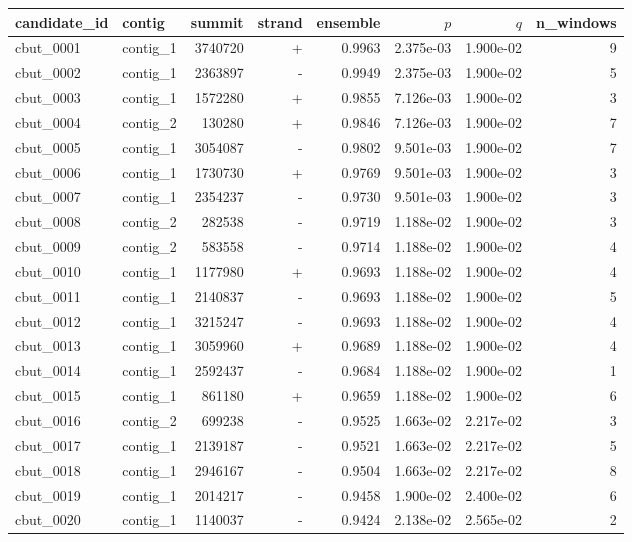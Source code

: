 \documentclass{article}
\begin{document}
{\def\LTcaptype{none} %
\begin{center}
\begin{tabular}{llrrrrrr}
\toprule
candidate\_id & contig & summit & strand & ensemble & $p$ & $q$ & n\_windows \\
\midrule
cbut\_0001 & contig\_1 & 3740720 & + & 0.9963 & 2.375e-03 & 1.900e-02 & 9 \\
cbut\_0002 & contig\_1 & 2363897 & - & 0.9949 & 2.375e-03 & 1.900e-02 & 5 \\
cbut\_0003 & contig\_1 & 1572280 & + & 0.9855 & 7.126e-03 & 1.900e-02 & 3 \\
cbut\_0004 & contig\_2 & 130280 & + & 0.9846 & 7.126e-03 & 1.900e-02 & 7 \\
cbut\_0005 & contig\_1 & 3054087 & - & 0.9802 & 9.501e-03 & 1.900e-02 & 7 \\
cbut\_0006 & contig\_1 & 1730730 & + & 0.9769 & 9.501e-03 & 1.900e-02 & 3 \\
cbut\_0007 & contig\_1 & 2354237 & - & 0.9730 & 9.501e-03 & 1.900e-02 & 3 \\
cbut\_0008 & contig\_2 & 282538 & - & 0.9719 & 1.188e-02 & 1.900e-02 & 3 \\
cbut\_0009 & contig\_2 & 583558 & - & 0.9714 & 1.188e-02 & 1.900e-02 & 4 \\
cbut\_0010 & contig\_1 & 1177980 & + & 0.9693 & 1.188e-02 & 1.900e-02 & 4 \\
cbut\_0011 & contig\_1 & 2140837 & - & 0.9693 & 1.188e-02 & 1.900e-02 & 5 \\
cbut\_0012 & contig\_1 & 3215247 & - & 0.9693 & 1.188e-02 & 1.900e-02 & 4 \\
cbut\_0013 & contig\_1 & 3059960 & + & 0.9689 & 1.188e-02 & 1.900e-02 & 4 \\
cbut\_0014 & contig\_1 & 2592437 & - & 0.9684 & 1.188e-02 & 1.900e-02 & 1 \\
cbut\_0015 & contig\_1 & 861180 & + & 0.9659 & 1.188e-02 & 1.900e-02 & 6 \\
cbut\_0016 & contig\_2 & 699238 & - & 0.9525 & 1.663e-02 & 2.217e-02 & 3 \\
cbut\_0017 & contig\_1 & 2139187 & - & 0.9521 & 1.663e-02 & 2.217e-02 & 5 \\
cbut\_0018 & contig\_1 & 2946167 & - & 0.9504 & 1.663e-02 & 2.217e-02 & 8 \\
cbut\_0019 & contig\_1 & 2014217 & - & 0.9458 & 1.900e-02 & 2.400e-02 & 6 \\
cbut\_0020 & contig\_1 & 1140037 & - & 0.9424 & 2.138e-02 & 2.565e-02 & 2 \\
\bottomrule
\end{tabular}
\end{center}
}
\end{document}

